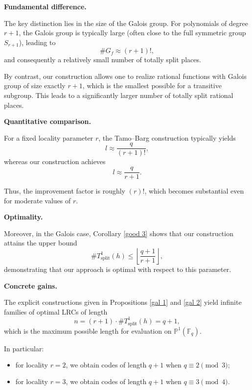 \documentclass[1p,final]{elsarticle}
\newtheorem{open problem}[theorem]{Open Problem}
\begin{document}
\medskip

\noindent
\textbf{Fundamental difference.}

The key distinction lies in the size of the Galois group. For polynomials of degree $r+1$, the Galois group is typically large (often close to the full symmetric group $S_{r+1}$), leading to
\[
\#G_f \approx (r+1)!,
\]
and consequently a relatively small number of totally split places.

\medskip

By contrast, our construction allows one to realize rational functions with Galois group of size exactly $r+1$, which is the smallest possible for a transitive subgroup. This leads to a significantly larger number of totally split rational places.

\medskip

\noindent
\textbf{Quantitative comparison.}

For a fixed locality parameter $r$, the Tamo--Barg construction typically yields
\[
l \approx \frac{q}{(r+1)!},
\]
whereas our construction achieves
\[
l \approx \frac{q}{r+1}.
\]

\medskip

Thus, the improvement factor is roughly $(r)!$, which becomes substantial even for moderate values of $r$.

\medskip

\noindent
\textbf{Optimality.}

Moreover, in the Galois case, Corollary \ref{good 3} shows that our construction attains the upper bound
\[
\# T_{\text{split}}^1(h) \le \left\lfloor \frac{q+1}{r+1} \right\rfloor,
\]
demonstrating that our approach is optimal with respect to this parameter.

\medskip

\noindent
\textbf{Concrete gains.}

The explicit constructions given in Propositions \ref{gal 1} and \ref{gal 2} yield infinite families of optimal LRCs of length
\[
n = (r+1)\cdot \# T_{\text{split}}^1(h) = q+1,
\]
which is the maximum possible length for evaluation on $\mathbb{P}^{1}(\mathbb{F}_q)$.

\medskip

In particular:
\begin{itemize}
\item for locality $r=2$, we obtain codes of length $q+1$ when $q\equiv 2 \pmod{3}$;
\item for locality $r=3$, we obtain codes of length $q+1$ when $q\equiv 3 \pmod{4}$.
\end{itemize}
\end{document}
